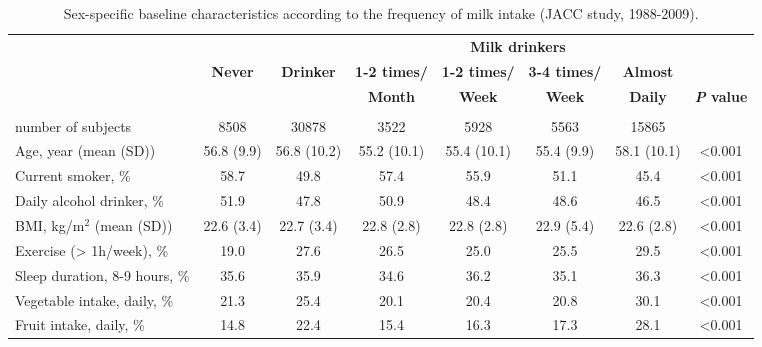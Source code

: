 \documentclass[nutrients,article,submit,moreauthors,pdftex]{mdpi}
\begin{document}
\begin{table}[H]
\caption{\label{tab:tab1f}Sex-specific baseline characteristics according to the frequency of milk intake (JACC study, 1988-2009).}
\centering
\fontsize{8}{10}\selectfont
\begin{tabular}[t]{lccccccc}
\toprule
\multicolumn{1}{c}{ } & \multicolumn{1}{c}{} & \multicolumn{1}{c}{} & \multicolumn{4}{c}{\textbf{Milk drinkers}} & \multicolumn{1}{c}{} \\
\cmidrule(l{3pt}r{3pt}){4-7}
 & \textbf{Never} & \textbf{Drinker} & \textbf{1-2 times/} & \textbf{1-2 times/} & \textbf{3-4 times/} & \textbf{Almost} & \\
 &       &         & \textbf{Month}     & \textbf{Week}      & \textbf{Week}         & \textbf{Daily}  & \textbf{\textit{P} value}\\
\midrule
\rowcolor{gray!6}  \addlinespace[0.3em]
\multicolumn{8}{l}{\textbf{Men (n = 39386)}}\\
\hspace{1em}number of subjects & 8508 & 30878 & 3522 & 5928 & 5563 & 15865 & \\
\hspace{1em}Age, year (mean (SD)) & 56.8 (9.9) & 56.8 (10.2) & 55.2 (10.1) & 55.4 (10.1) & 55.4 (9.9) & 58.1 (10.1) & <0.001\\
\rowcolor{gray!6}  \hspace{1em}Current smoker, \% & 58.7 & 49.8 & 57.4 & 55.9 & 51.1 & 45.4 & <0.001\\
\hspace{1em}Daily alcohol drinker, \% & 51.9 & 47.8 & 50.9 & 48.4 & 48.6 & 46.5 & <0.001\\
\rowcolor{gray!6}  \hspace{1em}BMI, kg/m$^2$ (mean (SD)) & 22.6 (3.4) & 22.7 (3.4) & 22.8 (2.8) & 22.8 (2.8) & 22.9 (5.4) & 22.6 (2.8) & <0.001\\
\hspace{1em}Exercise (> 1h/week), \% & 19.0 & 27.6 & 26.5 & 25.0 & 25.5 & 29.5 & <0.001\\
\rowcolor{gray!6}  \hspace{1em}Sleep duration, 8-9 hours, \% & 35.6 & 35.9 & 34.6 & 36.2 & 35.1 & 36.3 & <0.001\\
\hspace{1em}Vegetable intake, daily, \% & 21.3 & 25.4 & 20.1 & 20.4 & 20.8 & 30.1 & <0.001\\
\rowcolor{gray!6}  \hspace{1em}Fruit intake, daily, \% & 14.8 & 22.4 & 15.4 & 16.3 & 17.3 & 28.1 & <0.001\\

\end{tabular}
\end{table}
\end{document}
